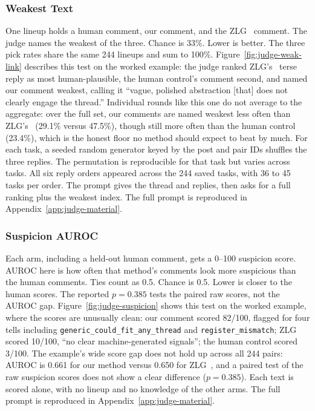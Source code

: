 \subsubsection{Weakest Text}
One lineup holds a human comment, our comment, and the ZLG~\cite{lin2024zero} comment.
The judge names the weakest of the three.
Chance is 33\%.
Lower is better.
The three pick rates share the same 244 lineups and sum to 100\%.
Figure~\ref{fig:judge-weak-link} describes this test on the worked example: the judge ranked ZLG's~\cite{lin2024zero} terse reply as most human-plausible, the human control's comment second, and named our comment weakest, calling it ``vague, polished abstraction [that] does not clearly engage the thread.''
Individual rounds like this one do not average to the aggregate: over the full set, our comments are named weakest less often than ZLG's~\cite{lin2024zero} (29.1\% versus 47.5\%), though still more often than the human control (23.4\%), which is the honest floor no method should expect to beat by much.
For each task, a seeded random generator keyed by the post and pair IDs shuffles the three replies. The permutation is reproducible for that task but varies across tasks. All six reply orders appeared across the 244 saved tasks, with 36 to 45 tasks per order. The prompt gives the thread and replies, then asks for a full ranking plus the weakest index.
The full prompt is reproduced in Appendix~\ref{app:judge-material}.



\subsubsection{Suspicion AUROC}
Each arm, including a held-out human comment, gets a 0--100 suspicion score.
AUROC here is how often that method's comments look more suspicious than the human comments.
Ties count as 0.5.
Chance is 0.5.
Lower is closer to the human scores.
The reported $p=0.385$ tests the paired raw scores, not the AUROC gap.
Figure~\ref{fig:judge-suspicion} shows this test on the worked example, where the scores are unusually clean: our comment scored 82/100, flagged for four tells including \texttt{generic\_could\_fit\_any\_thread} and \texttt{register\_mismatch}; ZLG~\cite{lin2024zero} scored 10/100, ``no clear machine-generated signals''; the human control scored 3/100.
The example's wide score gap does not hold up across all 244 pairs: AUROC is 0.661 for our method versus 0.650 for ZLG~\cite{lin2024zero}, and a paired test of the raw suspicion scores does not show a clear difference ($p=0.385$).
Each text is scored alone, with no lineup and no knowledge of the other arms.
The full prompt is reproduced in Appendix~\ref{app:judge-material}.



